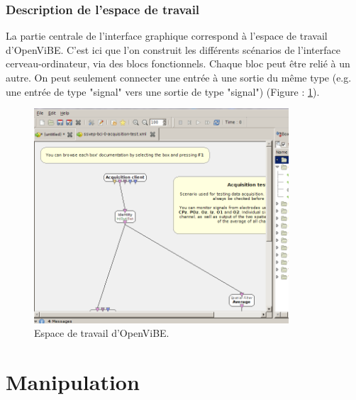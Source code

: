 \subsubsection*{Description de l'espace de travail}

La partie centrale de l'interface graphique correspond à l'espace de travail d'OpenViBE. C'est ici que l'on construit les différents scénarios de l'interface cerveau-ordinateur, via des blocs fonctionnels. Chaque bloc peut être relié à un autre. On peut seulement connecter une entrée à une sortie du même type (e.g. une entrée de type "signal" vers une sortie de type "signal") (Figure : \ref{fig:interface_travail_ov_4}).

\begin{figure}[h]
	\centering\includegraphics[height=8cm]{images/interface_travail_ov.png}
	\caption{Espace de travail d'OpenViBE.}
	\label{fig:interface_travail_ov_4}
\end{figure}


\newpage

\section*{Manipulation}

